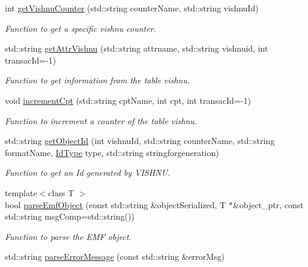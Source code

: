 \begin{DoxyCompactItemize}
int \hyperlink{namespacevishnu_a375f62c2679d5571765ec88609c2e58e}{getVishnuCounter} (std::string counterName, std::string vishnuId)
\begin{DoxyCompactList}\small\item\em Function to get a specific vishnu counter. \item\end{DoxyCompactList}\item 
std::string \hyperlink{namespacevishnu_a9fe5e4380f975a9464b670661facd3ba}{getAttrVishnu} (std::string attrname, std::string vishnuid, int transacId=-\/1)
\begin{DoxyCompactList}\small\item\em Function to get information from the table vishnu. \item\end{DoxyCompactList}\item 
void \hyperlink{namespacevishnu_ad0a54a97a8e3dc594ab1b1be77e63e4a}{incrementCpt} (std::string cptName, int cpt, int transacId=-\/1)
\begin{DoxyCompactList}\small\item\em Function to increment a counter of the table vishnu. \item\end{DoxyCompactList}\item 
std::string \hyperlink{namespacevishnu_a9349617bc14f92c6dfe67745dcbac8ff}{getObjectId} (int vishnuId, std::string counterName, std::string formatName, \hyperlink{namespacevishnu_aff8a694c2bc2b55465a31b4bf00f58c1}{IdType} type, std::string stringforgeneration)
\begin{DoxyCompactList}\small\item\em Function to get an Id generated by VISHNU. \item\end{DoxyCompactList}\item 
{\footnotesize template$<$class T $>$ }\\bool \hyperlink{namespacevishnu_a864d60dc9a2f4fe9048e522718698e84}{parseEmfObject} (const std::string \&objectSerialized, T $\ast$\&object\_\-ptr, const std::string msgComp=std::string())
\begin{DoxyCompactList}\small\item\em Function to parse the EMF object. \item\end{DoxyCompactList}\item 
std::string \hyperlink{namespacevishnu_aaf3976b9b53965c46bc9bcf847ba286f}{parseErrorMessage} (const std::string \&errorMsg)

\end{DoxyCompactItemize}
